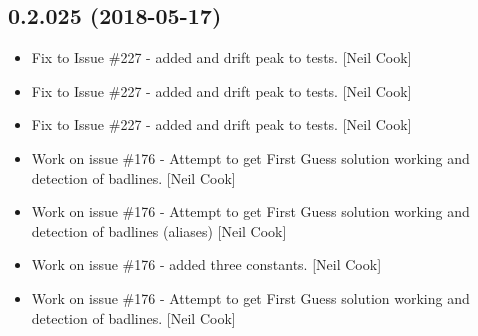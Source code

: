 \documentclass[a4paper,10pt,english]{report}
\begin{document}
\subsection{0.2.025 (2018-05-17)}
\label{\detokenize{misc/changelog:id435}}\begin{itemize}
\item {} 
Fix to Issue \#227 - added  and drift peak to tests. {[}Neil
Cook{]}

\item {} 
Fix to Issue \#227 - added  and drift peak to tests. {[}Neil
Cook{]}

\item {} 
Fix to Issue \#227 - added  and drift peak to tests. {[}Neil
Cook{]}

\item {} 
Work on issue \#176 - Attempt to get First Guess solution working and
detection of badlines. {[}Neil Cook{]}

\item {} 
Work on issue \#176 - Attempt to get First Guess solution working and
detection of badlines (aliases) {[}Neil Cook{]}

\item {} 
Work on issue \#176 - added three  constants. {[}Neil Cook{]}

\item {} 
Work on issue \#176 - Attempt to get First Guess solution working and
detection of badlines. {[}Neil Cook{]}

\end{itemize}
\end{document}
